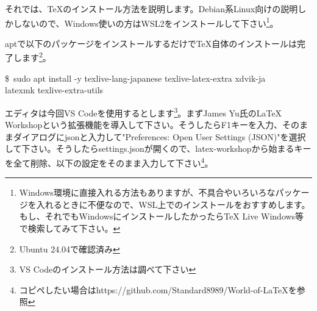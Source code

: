 \documentclass[paper=b5j]{jlreq}
\begin{document}
それでは、\TeX のインストール方法を説明します。Debian系Linux向けの説明しかしないので、Windows使いの方はWSL2をインストールして下さい\footnote{Windows環境に直接入れる方法もありますが、不具合やいろいろなパッケージを入れるときに不便なので、WSL上でのインストールをおすすめします。もし、それでもWindowsにインストールしたかったらTeX Live Windows等で検索してみて下さい。}。

aptで以下のパッケージをインストールするだけで\TeX 自体のインストールは完了します\footnote{Ubuntu 24.04で確認済み}。

\begin{center}
  \$\ sudo apt install -y texlive-lang-japanese  texlive-latex-extra xdvik-ja \\ latexmk texlive-extra-utils
\end{center}

エディタは今回VS Codeを使用するとします\footnote{VS Codeのインストール方法は調べて下さい}。まずJames Yu氏のLaTeX Workshopという拡張機能を導入して下さい。そうしたらF1キーを入力、そのままダイアログにjsonと入力して"Preferences: Open User Settings (JSON)"を選択して下さい。そうしたらsettings.jsonが開くので、latex-workshopから始まるキーを全て削除、以下の設定をそのまま入力して下さい\footnote{コピペしたい場合はhttps://github.com/Standard8989/World-of-LaTeXを参照}。
\end{document}
